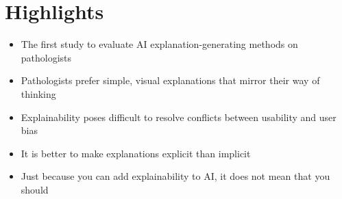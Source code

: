 \section*{\textbf{Highlights}}

\begin{itemize}
    \item The first study to evaluate AI explanation-generating methods on pathologists
    \item Pathologists prefer simple, visual explanations that mirror their way of thinking
    \item Explainability poses difficult to resolve conflicts between usability and user bias
    \item It is better to make explanations explicit than implicit
    \item Just because you can add explainability to AI, it does not mean that you should
\end{itemize}
